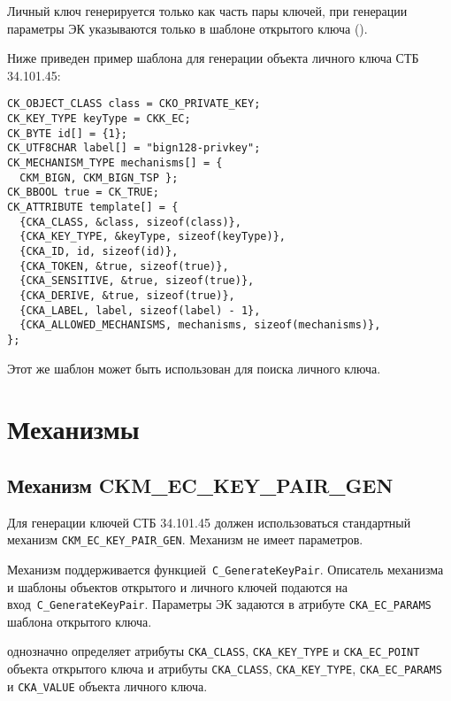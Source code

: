 Личный ключ генерируется только как часть пары ключей,
при генерации параметры ЭК указываются только в шаблоне
открытого ключа ().

Ниже приведен пример шаблона для генерации объекта личного ключа СТБ 34.101.45:
\begin{verbatim}
CK_OBJECT_CLASS class = CKO_PRIVATE_KEY;
CK_KEY_TYPE keyType = CKK_EC;
CK_BYTE id[] = {1};
CK_UTF8CHAR label[] = "bign128-privkey";
CK_MECHANISM_TYPE mechanisms[] = {
  CKM_BIGN, CKM_BIGN_TSP };
CK_BBOOL true = CK_TRUE;
CK_ATTRIBUTE template[] = {
  {CKA_CLASS, &class, sizeof(class)},
  {CKA_KEY_TYPE, &keyType, sizeof(keyType)},
  {CKA_ID, id, sizeof(id)},
  {CKA_TOKEN, &true, sizeof(true)},
  {CKA_SENSITIVE, &true, sizeof(true)},
  {CKA_DERIVE, &true, sizeof(true)},
  {CKA_LABEL, label, sizeof(label) - 1},
  {CKA_ALLOWED_MECHANISMS, mechanisms, sizeof(mechanisms)},
};
\end{verbatim}

Этот же шаблон может быть использован для поиска личного ключа.

\section{Механизмы}

\subsection{Механизм CKM\_EC\_KEY\_PAIR\_GEN}


Для генерации ключей СТБ 34.101.45 должен использоваться стандартный 
механизм \verb|CKM_EC_KEY_PAIR_GEN|. Механизм не имеет параметров. 

Механизм поддерживается функцией~\verb|C_GenerateKeyPair|. 
%
Описатель механизма и шаблоны объектов открытого и личного
ключей подаются на вход~\verb|C_GenerateKeyPair|. Параметры ЭК задаются в 
атрибуте \verb|CKA_EC_PARAMS| шаблона открытого ключа.

 однозначно определяет атрибуты
\verb|CKA_CLASS|, \verb|CKA_KEY_TYPE| и \verb|CKA_EC_POINT|
объекта открытого ключа и атрибуты
\verb|CKA_CLASS|, \verb|CKA_KEY_TYPE|, \verb|CKA_EC_PARAMS| и \verb|CKA_VALUE| объекта личного ключа.


